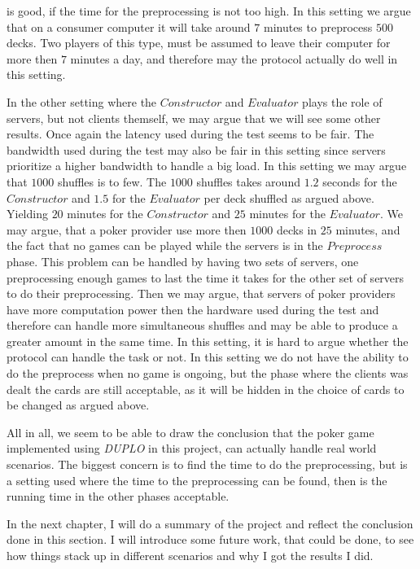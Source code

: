 \documentclass[twoside,11pt,openright]{report}
\newcommand{\DUPLO}{\textit{DUPLO} }
\begin{document}
is good, if the time for the preprocessing is not too high. In this setting we argue that on a consumer computer it will take around $7$ minutes to preprocess $500$ decks. Two players of this type, must be assumed to leave their computer for more then $7$ minutes a day, and therefore may the protocol actually do well in this setting.

In the other setting where the $Constructor$ and $Evaluator$ plays the role of servers, but not clients themself, we may argue that we will see some other results. Once again the latency used during the test seems to be fair. The bandwidth used during the test may also be fair in this setting since servers prioritize a higher bandwidth to handle a big load. In this setting we may argue that $1000$ shuffles is to few.  The $1000$ shuffles takes around $1.2$ seconds for the $Constructor$ and $1.5$ for the $Evaluator$ per deck shuffled as argued above. Yielding $20$ minutes for the $Constructor$ and $25$ minutes for the $Evaluator$. We may argue, that a poker provider use more then $1000$ decks in $25$ minutes, and the fact that no games can be played while the servers is in the $Preprocess$ phase. This problem can be handled by having two sets of servers, one preprocessing enough games to last the time it takes for the other set of servers to do their preprocessing. Then we may argue, that servers of poker providers have more computation power then the hardware used during the test and therefore can handle more simultaneous shuffles and may be able to produce a greater amount in the same time. In this setting, it is hard to argue whether the protocol can handle the task or not. In this setting we do not have the ability to do the preprocess when no game is ongoing, but the phase where the clients was dealt the cards are still acceptable, as it will be hidden in the choice of cards to be changed as argued above.

\bigskip

All in all, we seem to be able to draw the conclusion that the poker game implemented using \DUPLO in this project, can actually handle real world scenarios. The biggest concern is to find the time to do the preprocessing, but is a setting used where the time to the preprocessing can be found, then is the running time in the other phases acceptable.

In the next chapter, I will do a summary of the project and reflect the conclusion done in this section. I will introduce some future work, that could be done, to see how things stack up in different scenarios and why I got the results I did.
\end{document}
